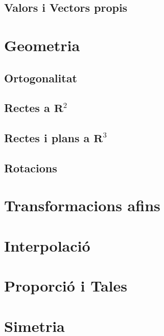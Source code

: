 \documentclass[12pt]{article}
\begin{document}
\begin{ExerciseList}
\subsection{Valors i Vectors propis}




\section{Geometria}
\subsection{Ortogonalitat}



\subsection{Rectes a $\mathbf{R}^2$}




\subsection{Rectes i plans a $\mathbf{R}^3$}




\subsection{Rotacions}

\section{Transformacions afins}







\section{Interpolació}



\section{Proporció i Tales}


\section{Simetria}


\end{ExerciseList}
\newpage
\end{document}
